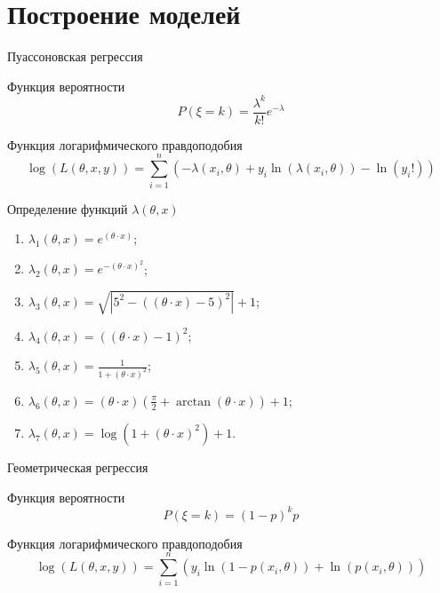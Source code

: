 \documentclass[aspectratio=169]{beamer}
\begin{document}
    \section{Построение моделей}    
    \begin{frame}{Пуассоновская регрессия}
        \begin{block}{Функция вероятности}
            $$P(\xi = k) = \dfrac{\lambda^k}{k!}e^{-\lambda}$$
        \end{block}
        
        \begin{block}{Функция логарифмического правдоподобия}
            $$\log(L(\theta, x, y)) = \sum\limits_{i=1}^{n} \left( -\lambda(x_i, \theta) + y_i \ln(\lambda(x_i, \theta)) - \ln(y_i!) \right)$$
        \end{block}
    \end{frame}


    \begin{frame}{Определение функций $\lambda(\theta, x)$}
        \begin{enumerate}
            \item $\lambda_1(\theta, x) = e^{(\theta \cdot x)}$;
            \item $\lambda_2(\theta, x) = e^{-(\theta \cdot x)^2}$;
            \item $\lambda_3(\theta, x) = \sqrt{|5^2 - ((\theta \cdot x) - 5)^2|} + 1$;
            \item $\lambda_4(\theta, x) = ((\theta \cdot x) - 1)^2$;
            \item $\lambda_5(\theta, x) = \frac{1}{1 + (\theta \cdot x)^2}$;
            \item $\lambda_6(\theta, x) = (\theta \cdot x) (\frac{\pi}{2} + \arctan(\theta \cdot x)) + 1$;
            \item $\lambda_7(\theta, x) = \log(1 + (\theta \cdot x)^2) + 1$.
        \end{enumerate}
    \end{frame}


    \begin{frame}{Геометрическая регрессия}
        \begin{block}{Функция вероятности}
            $$P(\xi = k) = (1-p)^k p$$
        \end{block}
        
        \begin{block}{Функция логарифмического правдоподобия}
            $$\log(L(\theta, x, y)) = \sum\limits_{i = 1}^n ( y_i \ln(1 - p(x_i,\theta)) + \ln(p(x_i,\theta)) )$$
        \end{block}        
    \end{frame}
\end{document}
